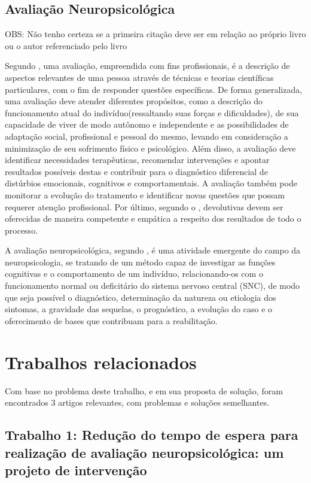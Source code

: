 \documentclass[
    12pt,                %
    openright,           %
    oneside,             %
    a4paper,             %
    english,             %
    brazil               %
]{abntex2}
\begin{document}
\subsection{Avaliação Neuropsicológica}
OBS: Não tenho certeza se a primeira citação deve ser em relação ao próprio livro ou o autor referenciado pelo livro

Segundo , uma avaliação, empreendida com fins profissionais, é a descrição de aspectos relevantes de uma pessoa através de técnicas e teorias científicas particulares, com o fim de responder questões específicas. De forma generalizada, uma avaliação deve atender diferentes propósitos, como a descrição do funcionamento atual do indivíduo(ressaltando suas forças e dificuldades), de sua capacidade de viver de modo autônomo e independente e as possibilidades de adaptação social, profissional e pessoal do mesmo, levando em consideração a minimização de seu sofrimento físico e psicológico. Além disso, a avaliação deve identificar necessidades terapêuticas, recomendar intervenções e apontar resultados possíveis destas e contribuir para o diagnóstico diferencial de distúrbios emocionais, cognitivos e comportamentais. A avaliação também pode monitorar a evolução do tratamento e identificar novas questões que possam requerer atenção profissional. Por último, segundo o , devolutivas devem ser oferecidas de maneira competente e empática a respeito dos resultados de todo o processo. 

A avaliação neuropsicológica, segundo , é uma atividade emergente do campo da neuropsicologia, se tratando de um método capaz de investigar as funções cognitivas e o comportamento de um indivíduo, relacionando-os com o funcionamento normal ou deficitário do sistema nervoso central (SNC), de modo que seja possível o diagnóstico, determinação da natureza ou etiologia dos sintomas, a gravidade das sequelas, o prognóstico, a evolução do caso e o oferecimento de bases que contribuam para a reabilitação.


\section{Trabalhos relacionados}
\label{sec:trabalhos_relacionados}

Com base no problema deste trabalho, e em sua proposta de solução, foram encontrados 3 artigos relevantes, com problemas e soluções semelhantes.

\subsection{Trabalho 1: Redução do tempo de espera para realização de avaliação neuropsicológica: um projeto de intervenção \cite{Silva2023}}
\end{document}
